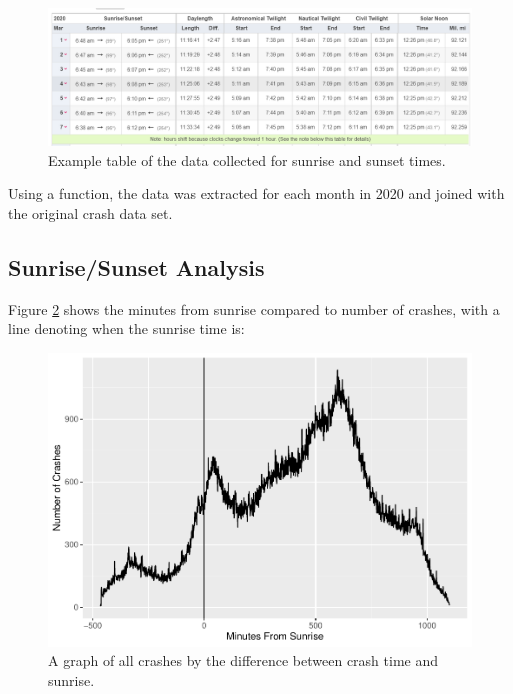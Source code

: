 \documentclass[conference,final,]{IEEEtran}
\begin{document}
\begin{figure}

{\centering \includegraphics[width=0.9\columnwidth]{../images/paste-5719206D} 

}

\caption{Example table of the data collected for sunrise and sunset times.}\label{fig:timeanddate}
\end{figure}

Using a function, the data was extracted for each month in 2020 and joined with the original crash data set.

\hypertarget{sunrisesunset-analysis-1}{%
\subsection{Sunrise/Sunset Analysis}\label{sunrisesunset-analysis-1}}

Figure \ref{fig:sunrise} shows the minutes from sunrise compared to number of crashes, with a line denoting when the sunrise time is:

\begin{figure}

{\centering \includegraphics[width=0.9\columnwidth]{CAUSE_files/figure-latex/sunrise-1} 

}

\caption{A graph of all crashes by the difference between crash time and sunrise.}\label{fig:sunrise}
\end{figure}
\end{document}
